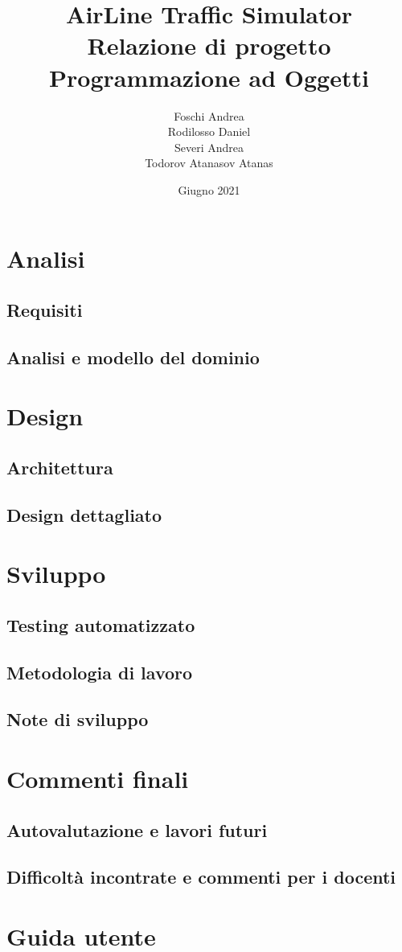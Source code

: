 \documentclass[a4paper,12pt]{report}
\title{
\textbf{AirLine Traffic Simulator}
\\Relazione di progetto
\\Programmazione ad Oggetti
}
\date{Giugno 2021}
\author{
Foschi Andrea
\\Rodilosso Daniel
\\Severi Andrea
\\Todorov Atanasov Atanas
}
\begin{document}
\maketitle

\tableofcontents

\chapter{Analisi}
\section{Requisiti}
\section{Analisi e modello del dominio}

\chapter{Design}
\section{Architettura}
\section{Design dettagliato}

\chapter{Sviluppo}
\section{Testing automatizzato}
\section{Metodologia di lavoro}
\section{Note di sviluppo}

\chapter{Commenti finali}
\section{Autovalutazione e lavori futuri}
\section{Difficoltà incontrate e commenti per i docenti}

\chapter{Guida utente}
\end{document}
